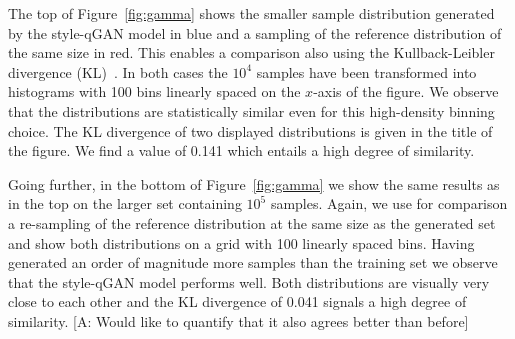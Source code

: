\documentclass[twocolumn,preprintnumbers,superscriptaddress]{revtex4-2}
\newcommand{\commentAF}[1]{{\color{cyan} {[A: #1]}}}
\begin{document}
The top of Figure~\ref{fig:gamma} shows the smaller sample distribution generated by the style-qGAN model in blue and a sampling of the reference distribution of the same size in red. This enables a comparison also using the Kullback-Leibler divergence (KL)~\cite{kullback1951information}.
In both cases the $10^4$ samples have been transformed into histograms with 100 bins linearly spaced on the $x$-axis of the figure. We observe that the distributions are statistically similar even for this high-density binning choice. The KL divergence of two displayed distributions is given in the title of the figure. We find a value of 0.141 which entails a high degree of similarity. 

Going further, in the bottom of Figure~\ref{fig:gamma} we show the same results as in the top on the larger set containing $10^5$ samples. Again, we use for comparison a re-sampling of the reference distribution at the same size as the generated set and show both distributions on a grid with 100 linearly spaced bins. 
%
Having generated an order of magnitude more samples than the training set we observe that the style-qGAN model performs well. Both distributions are visually very close to each other and the KL divergence of 0.041 signals a high degree of similarity. \commentAF{Would like to quantify that it also agrees better than before}
\end{document}

